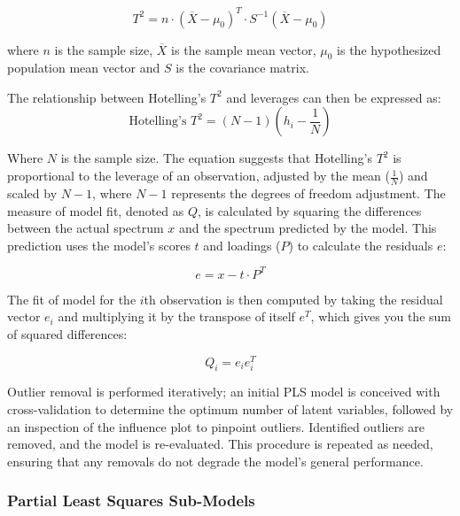\begin{equation}
    T^2 = n \cdot (\overline{X} - \mu_0)^T \cdot S^{-1}(\overline{X} - \mu_0)
\end{equation}

where $n$ is the sample size, $\overline{X}$ is the sample mean vector, $\mu_0$ is the hypothesized population mean vector and $S$ is the covariance matrix.

The relationship between Hotelling's \( T^2 \) and leverages can then be expressed as:
\begin{equation}
    \text{Hotelling's } T^2 = (N - 1) (h_i - \frac{1}{N})
\end{equation}

Where $N$ is the sample size. The equation suggests that Hotelling's $T^2$ is proportional to the leverage of an observation, adjusted by the mean ($\frac{1}{N}$) and scaled by $N - 1$, where $N - 1$ represents the degrees of freedom adjustment.
The measure of model fit, denoted as $Q$, is calculated by squaring the differences between the actual spectrum $x$ and the spectrum predicted by the model. This prediction uses the model's scores $t$ and loadings ($P$) to calculate the residuals $e$:

\begin{equation}
    e = x - t \cdot P^T
\end{equation}

The fit of model for the $i$th observation is then computed by taking the residual vector $e_i$ and multiplying it by the transpose of itself $e^T$, which gives you the sum of squared differences: 

\begin{equation}
    Q_i = e_{i}e_{i}^T
\end{equation} \cite{marini_chemometrics_2013} \citet{andersonImprovedAccuracyQuantitative2017}

Outlier removal is performed iteratively; an initial PLS model is conceived with cross-validation to determine the optimum number of latent variables, followed by an inspection of the influence plot to pinpoint outliers. Identified outliers are removed, and the model is re-evaluated. This procedure is repeated as needed, ensuring that any removals do not degrade the model's general performance.


\subsubsection{Partial Least Squares Sub-Models}\label{sec:pls_submodels}

